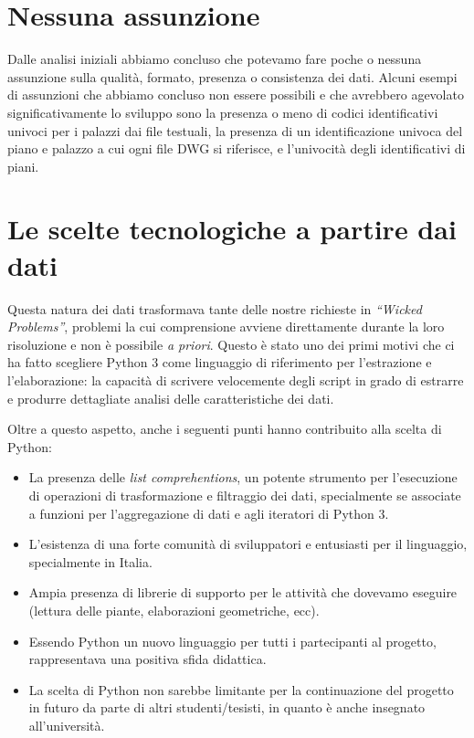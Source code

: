 \documentclass[12pt]{report}
\begin{document}
\section*{Nessuna assunzione}

Dalle analisi iniziali abbiamo concluso che potevamo fare poche o nessuna assunzione sulla qualità, formato, presenza o consistenza dei dati. Alcuni esempi di assunzioni che abbiamo concluso non essere possibili e che avrebbero agevolato significativamente lo sviluppo sono la presenza o meno di codici identificativi univoci per i palazzi dai file testuali, la presenza di un identificazione univoca del piano e palazzo a cui ogni file DWG si riferisce, e l'univocità degli identificativi di piani.

\section{Le scelte tecnologiche a partire dai dati}

Questa natura dei dati trasformava tante delle nostre richieste in \textit{``Wicked Problems''}, problemi la cui comprensione avviene direttamente durante la loro risoluzione e non è possibile \textit{a priori}. Questo è stato uno dei primi motivi che ci ha fatto scegliere Python 3 come linguaggio di riferimento per l'estrazione e l'elaborazione: la capacità di scrivere velocemente degli script in grado di estrarre e produrre dettagliate analisi delle caratteristiche dei dati.

Oltre a questo aspetto, anche i seguenti punti hanno contribuito alla scelta di Python:
\begin{itemize}
  \item La presenza delle \textit{list comprehentions}, un potente strumento per l'esecuzione di operazioni di trasformazione e filtraggio dei dati, specialmente se associate a funzioni per l'aggregazione di dati e agli iteratori di Python 3.
  \item L'esistenza di una forte comunità di sviluppatori e entusiasti per il linguaggio, specialmente in Italia.
  \item Ampia presenza di librerie di supporto per le attività che dovevamo eseguire (lettura delle piante, elaborazioni geometriche, ecc).
  \item Essendo Python un nuovo linguaggio per tutti i partecipanti al progetto, rappresentava una positiva sfida didattica.
  \item La scelta di Python non sarebbe limitante per la continuazione del progetto in futuro da parte di altri studenti/tesisti, in quanto è anche insegnato all'università.
\end{itemize}
\end{document}
